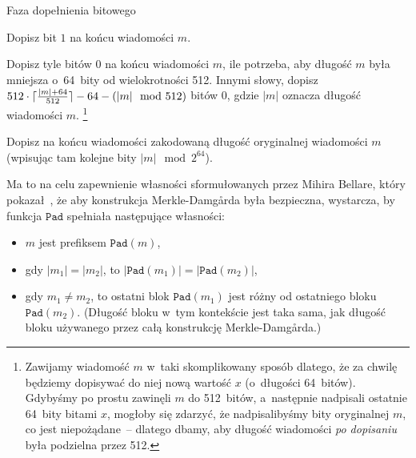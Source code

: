 \documentclass[12pt,a4paper,twoside]{article}
\begin{document}
\begin{myenumerate}

    \item Faza dopełnienia bitowego

    \begin{myenumerate}

        \item Dopisz bit $1$ na końcu wiadomości $m$.

        \item Dopisz tyle bitów $0$ na końcu wiadomości $m$, ile potrzeba, aby
        długość $m$ była mniejsza o~64~bity od wielokrotności 512. Innymi
        słowy, dopisz $512 \cdot \lceil\frac{|m|+64}{512}\rceil-64-(|m| \mod{512})$
        bitów $0$, gdzie $|m|$ oznacza długość wiadomości $m$.
        \footnote{Zawijamy wiadomość $m$ w~taki skomplikowany sposób dlatego,
        że za chwilę będziemy dopisywać do niej nową wartość $x$ (o~długości
        64~bitów). Gdybyśmy po prostu zawinęli $m$ do 512~bitów, a~następnie
        nadpisali ostatnie 64~bity bitami $x$, mogłoby się zdarzyć, że
        nadpisalibyśmy bity oryginalnej $m$, co jest niepożądane~-- dlatego
        dbamy, aby długość wiadomości \emph{po dopisaniu} była podzielna przez
        512.}

        \item Dopisz na końcu wiadomości zakodowaną długość oryginalnej
        wiadomości $m$ (wpisując tam kolejne bity $|m| \mod{2^{64}}$).

        Ma to na celu zapewnienie własności sformułowanych przez Mihira
        Bellare, który pokazał~\cite{merkle_damgard_strengthening}, że aby
        konstrukcja Merkle-Damg\r{a}rda była bezpieczna, wystarcza, by funkcja
        $\mathtt{Pad}$ spełniała następujące własności:

        \begin{itemize}

            \item $m$ jest prefiksem $\mathtt{Pad}(m)$,

            \item gdy $|m_1| = |m_2|$, to $|\mathtt{Pad}(m_1)| =
            |\mathtt{Pad}(m_2)|$,

            \item gdy $m_1 \neq m_2$, to ostatni blok $\mathtt{Pad}(m_1)$ jest
            różny od ostatniego bloku $\mathtt{Pad}(m_2)$. (Długość bloku w~tym
            kontekście jest taka sama, jak długość bloku używanego przez całą
            konstrukcję Merkle-Damg\r{a}rda.)


\end{itemize}
\end{myenumerate}
\end{myenumerate}
\end{document}

